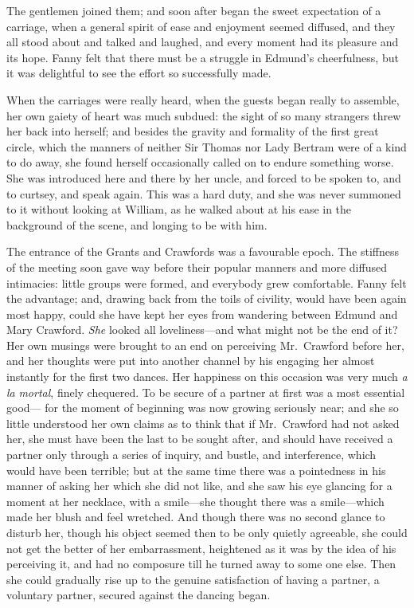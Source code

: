 The gentlemen joined them; and soon after began the sweet
expectation of a carriage, when a general spirit of ease
and enjoyment seemed diffused, and they all stood about
and talked and laughed, and every moment had its pleasure
and its hope.  Fanny felt that there must be a struggle
in Edmund's cheerfulness, but it was delightful to see
the effort so successfully made.

When the carriages were really heard, when the guests began
really to assemble, her own gaiety of heart was much subdued:
the sight of so many strangers threw her back into herself;
and besides the gravity and formality of the first great circle,
which the manners of neither Sir Thomas nor Lady Bertram
were of a kind to do away, she found herself occasionally
called on to endure something worse.  She was introduced
here and there by her uncle, and forced to be spoken to,
and to curtsey, and speak again.  This was a hard duty,
and she was never summoned to it without looking at William,
as he walked about at his ease in the background of the scene,
and longing to be with him.

The entrance of the Grants and Crawfords was a favourable epoch.
The stiffness of the meeting soon gave way before their
popular manners and more diffused intimacies:  little groups
were formed, and everybody grew comfortable.  Fanny felt
the advantage; and, drawing back from the toils of civility,
would have been again most happy, could she have kept
her eyes from wandering between Edmund and Mary Crawford.
\emph{She} looked all loveliness---and what might not be
the end of it?  Her own musings were brought to an end
on perceiving Mr.\ Crawford before her, and her thoughts
were put into another channel by his engaging her almost
instantly for the first two dances.  Her happiness on this
occasion was very much \emph{a} \emph{la} \emph{mortal}, finely chequered.
To be secure of a partner at first was a most essential good---%
for the moment of beginning was now growing seriously near;
and she so little understood her own claims as to think
that if Mr.\ Crawford had not asked her, she must have been
the last to be sought after, and should have received
a partner only through a series of inquiry, and bustle,
and interference, which would have been terrible; but at
the same time there was a pointedness in his manner of asking
her which she did not like, and she saw his eye glancing
for a moment at her necklace, with a smile---she thought
there was a smile---which made her blush and feel wretched.
And though there was no second glance to disturb her,
though his object seemed then to be only quietly agreeable,
she could not get the better of her embarrassment,
heightened as it was by the idea of his perceiving it,
and had no composure till he turned away to some one else.
Then she could gradually rise up to the genuine satisfaction
of having a partner, a voluntary partner, secured against
the dancing began.

